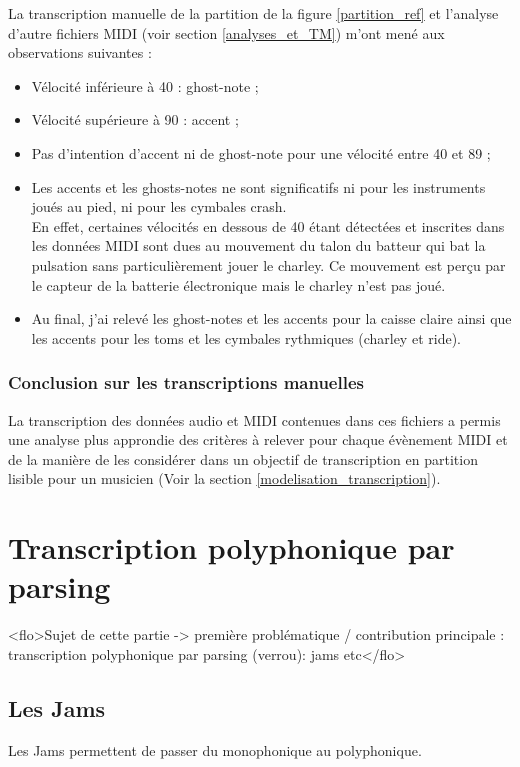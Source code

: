 La transcription manuelle de la partition de la figure \ref{partition_ref} et
l'analyse d'autre fichiers MIDI (voir section \ref{analyses_et_TM}) m’ont mené
aux observations suivantes :
\begin{itemize}
	\item Vélocité inférieure à 40 : ghost-note ;
	\item Vélocité supérieure à 90 : accent ;
	\item Pas d’intention d’accent ni de ghost-note pour une vélocité entre 40
        et 89 ;
	\item Les accents et les ghosts-notes ne sont significatifs ni pour les
        instruments joués au pied, ni pour les cymbales crash.\\
	En effet, certaines vélocités en dessous de 40 étant détectées et inscrites
    dans les données MIDI sont dues au mouvement du talon du batteur qui bat la
    pulsation sans particulièrement jouer le charley. Ce mouvement est perçu
    par le capteur de la batterie électronique mais le charley n’est pas joué.
	\item Au final, j’ai relevé les ghost-notes et les accents pour la caisse
        claire ainsi que les accents pour les toms et les cymbales rythmiques
        (charley et ride).
\end{itemize}


\subsubsection{Conclusion sur les transcriptions manuelles}
La transcription des données audio et MIDI contenues dans ces fichiers a permis
une analyse plus approndie des critères à relever pour chaque évènement MIDI et
de la manière de les considérer dans un objectif de transcription en partition
lisible pour un musicien (Voir la section \ref{modelisation_transcription}).


\section{Transcription polyphonique par parsing}
<flo>Sujet de cette partie -> première problématique / contribution
principale : transcription polyphonique par parsing (verrou): jams etc</flo>

\subsection*{Les Jams}
Les Jams permettent de passer du monophonique au polyphonique.
\label{jam_tests}

